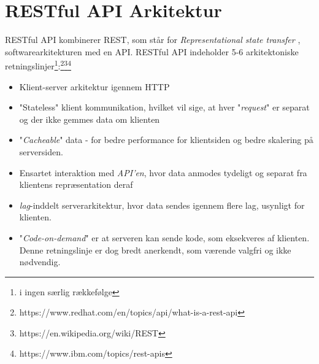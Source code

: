 \documentclass{report}
\begin{document}
\section{RESTful API Arkitektur}
RESTful API kombinerer REST, som står for \textit{Representational state transfer} , softwarearkitekturen med en API.
RESTful API indeholder 5-6 arkitektoniske retningslinjer\footnote{i ingen særlig rækkefølge}:\footnote{https://www.redhat.com/en/topics/api/what-is-a-rest-api}\footnote{https://en.wikipedia.org/wiki/REST}\footnote{https://www.ibm.com/topics/rest-apis}
\begin{itemize}     
\item Klient-server arkitektur igennem HTTP
\item "Stateless" klient kommunikation, hvilket vil sige, at hver "\textit{request}" er separat og der ikke gemmes data om klienten
\item "\textit{Cacheable}" data - for bedre performance for klientsiden og bedre skalering på serversiden.
\item Ensartet interaktion med \textit{API’en}, hvor data anmodes tydeligt og separat fra klientens repræsentation deraf
\item \textit{lag}-inddelt serverarkitektur, hvor data sendes igennem flere lag, usynligt for klienten.
\item "\textit{Code-on-demand}" er at serveren kan sende kode, som eksekveres af klienten. Denne retningslinje er dog bredt anerkendt, som værende valgfri og ikke nødvendig.
\end{itemize}
\end{document}
